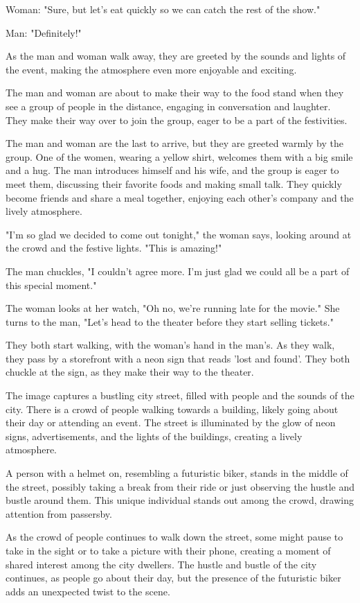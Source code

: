 \documentclass[smalldemyvopaper,11pt,twoside,onecolumn,openright,extrafontsizes]{memoir}
\begin{document}
Woman: "Sure, but let's eat quickly so we can catch the rest of the show."\par
Man: "Definitely!"\par
As the man and woman walk away, they are greeted by the sounds and lights of the event, making the atmosphere even more enjoyable and exciting.\par
The man and woman are about to make their way to the food stand when they see a group of people in the distance, engaging in conversation and laughter. They make their way over to join the group, eager to be a part of the festivities.\par
The man and woman are the last to arrive, but they are greeted warmly by the group. One of the women, wearing a yellow shirt, welcomes them with a big smile and a hug. The man introduces himself and his wife, and the group is eager to meet them, discussing their favorite foods and making small talk. They quickly become friends and share a meal together, enjoying each other's company and the lively atmosphere.\par
"I'm so glad we decided to come out tonight," the woman says, looking around at the crowd and the festive lights. "This is amazing!"\par
The man chuckles, "I couldn't agree more. I'm just glad we could all be a part of this special moment."\par
The woman looks at her watch, "Oh no, we're running late for the movie." She turns to the man, "Let's head to the theater before they start selling tickets."\par
They both start walking, with the woman's hand in the man's. As they walk, they pass by a storefront with a neon sign that reads 'lost and found'. They both chuckle at the sign, as they make their way to the theater.\par
The image captures a bustling city street, filled with people and the sounds of the city. There is a crowd of people walking towards a building, likely going about their day or attending an event. The street is illuminated by the glow of neon signs, advertisements, and the lights of the buildings, creating a lively atmosphere.\par
A person with a helmet on, resembling a futuristic biker, stands in the middle of the street, possibly taking a break from their ride or just observing the hustle and bustle around them. This unique individual stands out among the crowd, drawing attention from passersby.\par
As the crowd of people continues to walk down the street, some might pause to take in the sight or to take a picture with their phone, creating a moment of shared interest among the city dwellers. The hustle and bustle of the city continues, as people go about their day, but the presence of the futuristic biker adds an unexpected twist to the scene.\par
\end{document}
